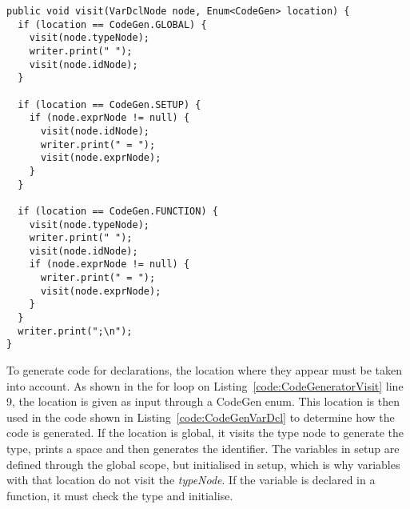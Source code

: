 \begin{lstlisting}[caption={Generating code for a variable declaration }, label={code:CodeGenVarDcl}]
public void visit(VarDclNode node, Enum<CodeGen> location) {
  if (location == CodeGen.GLOBAL) {
    visit(node.typeNode);
    writer.print(" ");
    visit(node.idNode);
  }

  if (location == CodeGen.SETUP) {
    if (node.exprNode != null) {
      visit(node.idNode);
      writer.print(" = ");
      visit(node.exprNode);
    }
  }

  if (location == CodeGen.FUNCTION) {
    visit(node.typeNode);
    writer.print(" ");
    visit(node.idNode);
    if (node.exprNode != null) {
      writer.print(" = ");
      visit(node.exprNode);
    }
  }
  writer.print(";\n");
}
\end{lstlisting}
To generate code for declarations, the location where they appear must be taken into account. As shown in the for loop on Listing~\ref{code:CodeGeneratorVisit} line 9, the location is given as input through a CodeGen enum. This location is then used in the code shown in Listing~\ref{code:CodeGenVarDcl} to determine how the code is generated. If the location is global, it visits the type node to generate the type, prints a space and then generates the identifier. The variables in setup are defined through the global scope, but initialised in setup, which is why variables with that location do not visit the \textit{typeNode}. If the variable is declared in a function, it must check the type and initialise. 


